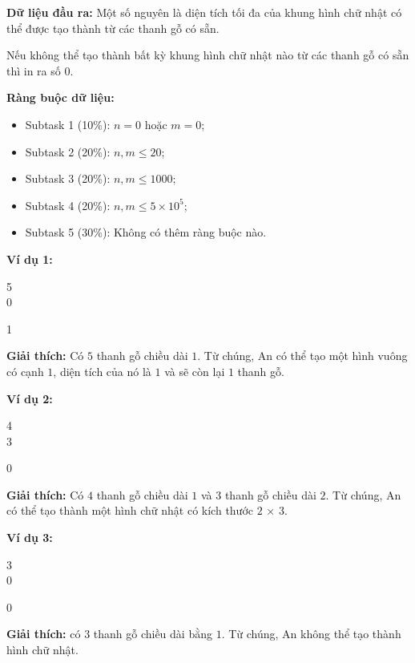 \documentclass[12pt]{scrartcl}  %
\begin{document}
\textbf{Dữ liệu đầu ra:}
Một số nguyên là diện tích tối đa của khung hình chữ nhật có thể được tạo thành từ các thanh gỗ có sẵn.

Nếu không thể tạo thành bất kỳ khung hình chữ nhật nào từ các thanh gỗ có sẵn thì in ra số $0$.

\textbf{Ràng buộc dữ liệu:}
\begin{itemize}
    \item Subtask 1 (10\%): $n = 0$ hoặc $m = 0$;
    \item Subtask 2 (20\%): $n, m \leq 20$;
    \item Subtask 3 (20\%): $n, m \leq 1000$;
    \item Subtask 4 (20\%): $n, m \leq 5 \times 10^5$;
    \item Subtask 5 (30\%): Không có thêm ràng buộc nào.
\end{itemize}

\textbf{Ví dụ 1:}
\begin{tcolorbox}[colback=gray!5!white, colframe=blue!50!black, title=Input]
5\\
0
\end{tcolorbox}
\begin{tcolorbox}[colback=gray!5!white, colframe=green!50!black, title=Output]
1
\end{tcolorbox}

\textbf{Giải thích:}
Có $5$ thanh gỗ chiều dài $1$. Từ chúng, An có thể tạo một hình vuông có cạnh $1$, diện tích của nó là $1$ và sẽ còn lại $1$ thanh gỗ.

\textbf{Ví dụ 2:}
\begin{tcolorbox}[colback=gray!5!white, colframe=blue!50!black, title=Input]
4\\
3
\end{tcolorbox}
\begin{tcolorbox}[colback=gray!5!white, colframe=green!50!black, title=Output]
0
\end{tcolorbox}
\textbf{Giải thích:}
Có $4$ thanh gỗ chiều dài $1$ và $3$ thanh gỗ chiều dài $2$. Từ chúng, An có thể tạo thành một hình chữ nhật có kích thước $2$ × $3$.

\textbf{Ví dụ 3:}
\begin{tcolorbox}[colback=gray!5!white, colframe=blue!50!black, title=Input]
3\\
0
\end{tcolorbox}
\begin{tcolorbox}[colback=gray!5!white, colframe=green!50!black, title=Output]
0
\end{tcolorbox}
\textbf{Giải thích:}
có $3$ thanh gỗ chiều dài bằng $1$. Từ chúng, An không thể tạo thành hình chữ nhật.
\end{document}
